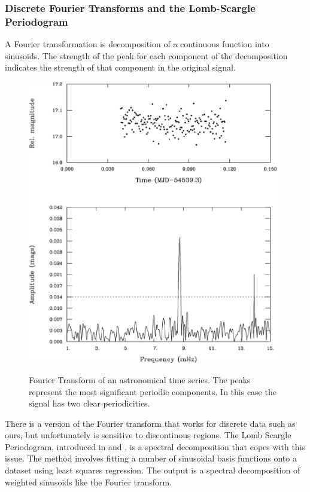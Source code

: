 	\subsubsection{Discrete Fourier Transforms and the Lomb-Scargle Periodogram}
	A Fourier transformation is decomposition of a continuous function into sinusoids. The strength of the peak for each component of the decomposition indicates the strength of that component in the original signal. 
	\begin{figure}[ht!]
	\centering
	\includegraphics[width=110mm]{images/discretefft.eps}
	\label{fig:fouriertransform}
	\caption{Fourier Transform of an astronomical time series. The peaks represent the most significant periodic components. In this case the signal has two clear periodicities.}
	\end{figure}
	There is a version of the Fourier transform that works for discrete data such as ours, but unfortunately is sensitive to discontinous regions. The Lomb Scargle Periodogram, introduced in \citep{lomb1976least} and \citep{scargle1982studies}, is a spectral decomposition that copes with this issue. The method involves fitting a number of sinusoidal basis functions onto a dataset using least squares regression. The output is a spectral decomposition of weighted sinusoids like the Fourier transform.
	

